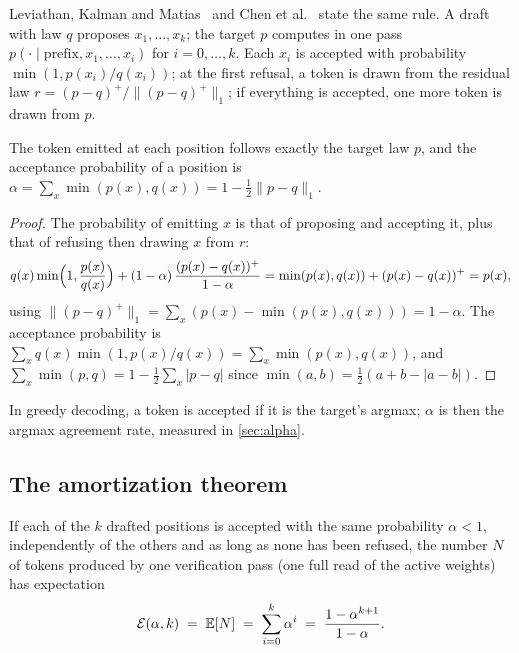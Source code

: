 Leviathan, Kalman and Matias~\cite{leviathan2023} and Chen et al.~\cite{chen2023spec} state the same rule. A draft with law $q$ proposes $x_1, \dots, x_k$; the target $p$ computes in one pass $p(\cdot \mid \text{prefix}, x_1, \dots, x_i)$ for $i = 0, \dots, k$. Each $x_i$ is accepted with probability $\min(1, p(x_i)/q(x_i))$; at the first refusal, a token is drawn from the residual law $r = (p - q)^+ / \lVert (p - q)^+ \rVert_1$; if everything is accepted, one more token is drawn from $p$.

\begin{proposition}\label{prop:exacte}
The token emitted at each position follows exactly the target law $p$, and the acceptance probability of a position is $\alpha = \sum_x \min(p(x), q(x)) = 1 - \tfrac12 \lVert p - q \rVert_1$.
\end{proposition}

\begin{proof}
The probability of emitting $x$ is that of proposing and accepting it, plus that of refusing then drawing $x$ from $r$:
\[
q(x) \min\Bigl(1, \frac{p(x)}{q(x)}\Bigr) + (1-\alpha)\, \frac{(p(x) - q(x))^+}{1 - \alpha} = \min(p(x), q(x)) + (p(x) - q(x))^+ = p(x),
\]
using $\lVert (p-q)^+ \rVert_1 = \sum_x (p(x) - \min(p(x),q(x))) = 1 - \alpha$. The acceptance probability is $\sum_x q(x)\min(1, p(x)/q(x)) = \sum_x \min(p(x), q(x))$, and $\sum_x \min(p,q) = 1 - \tfrac12 \sum_x |p - q|$ since $\min(a,b) = \tfrac12(a + b - |a-b|)$.
\end{proof}

In greedy decoding, a token is accepted if it is the target's argmax; $\alpha$ is then the argmax agreement rate, measured in \cref{sec:alpha}.

\subsection{The amortization theorem}

\begin{theoreme}\label{thm:amortissement}
If each of the $k$ drafted positions is accepted with the same probability $\alpha < 1$, independently of the others and as long as none has been refused, the number $N$ of tokens produced by one verification pass (one full read of the active weights) has expectation
\begin{equation}\label{eq:amortissement}
\mathcal E(\alpha, k) \;=\; \mathbb{E}[N] \;=\; \sum_{i=0}^{k} \alpha^i \;=\; \frac{1 - \alpha^{k+1}}{1 - \alpha}.
\end{equation}
\end{theoreme}

